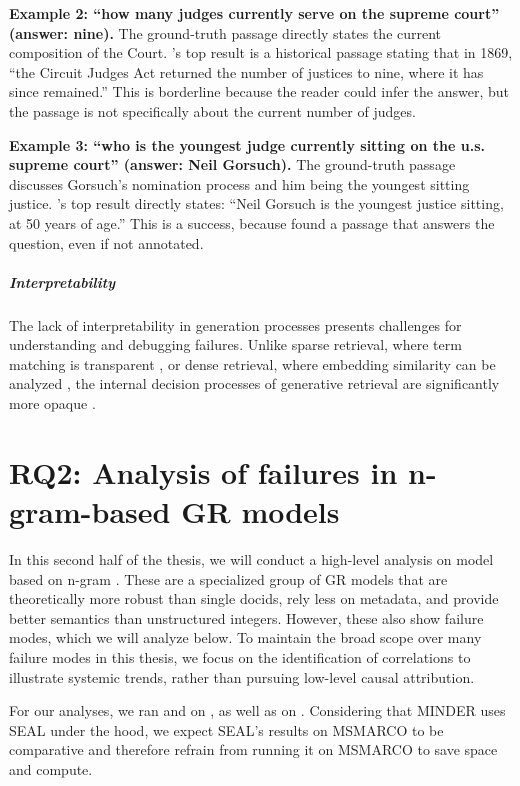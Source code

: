 \textbf{Example 2: ``how many judges currently serve on the supreme court'' (answer: nine).} The ground-truth passage 
directly states the current composition of the Court. 's top result is a historical passage stating that in 1869, ``the Circuit Judges Act returned the number of justices to nine, where it has since remained.'' This is borderline because the reader could infer the answer, but the passage is not specifically about the current number of judges.

\textbf{Example 3: ``who is the youngest judge currently sitting on the u.s. supreme court'' (answer: Neil Gorsuch).} The ground-truth passage discusses Gorsuch's nomination process and him being the youngest sitting justice. 's top result
directly states: ``Neil Gorsuch is the youngest justice sitting, at 50 years of age.'' This is a success, because  found a passage that answers the question, even if not annotated.


\subparagraph{Interpretability}
The lack of interpretability in generation processes presents challenges for understanding and debugging failures. Unlike sparse retrieval, where term matching is transparent \cite{robertson-the-probabilistic,formal-splade-sparse}, or dense retrieval, where embedding similarity can be analyzed \cite{vladimir-karpukhin-dense-passage}, the internal decision processes of generative retrieval are significantly more opaque \cite{tang-recent-advances,andrew-slavin-ross-evaluating-the}.


\section{RQ2: Analysis of failures in n-gram-based GR models}

In this second half of the thesis, we will conduct a high-level analysis on  model based on n-gram . These are a specialized group of GR models that are theoretically more robust than single docids, rely less on metadata, and provide better semantics than unstructured integers. However, these also show failure modes, which we will analyze below. To maintain the broad scope over many failure modes in this thesis, we focus on the identification of correlations to illustrate systemic trends, rather than pursuing low-level causal attribution.

For our analyses, we ran  and  on , as well as  on . Considering that MINDER uses SEAL under the hood, we expect SEAL's results on MSMARCO to be comparative and therefore refrain from running it on MSMARCO to save space and compute.


